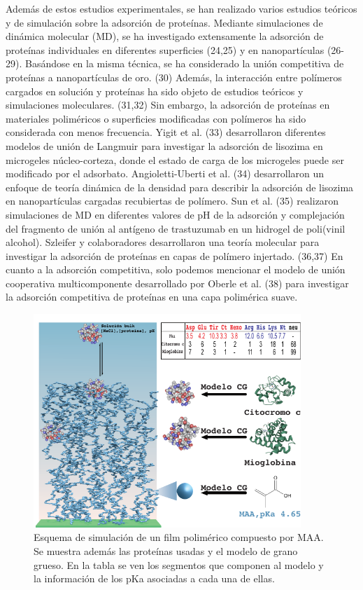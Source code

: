 Además de estos estudios experimentales, se han realizado varios estudios teóricos y de simulación sobre la adsorción de proteínas. Mediante simulaciones de dinámica molecular (MD), se ha investigado extensamente la adsorción de proteínas individuales en diferentes superficies (24,25) y en nanopartículas (26-29). Basándose en la misma técnica, se ha considerado la unión competitiva de proteínas a nanopartículas de oro. (30) Además, la interacción entre polímeros cargados en solución y proteínas ha sido objeto de estudios teóricos y simulaciones moleculares. (31,32) Sin embargo, la adsorción de proteínas en materiales poliméricos o superficies modificadas con polímeros ha sido considerada con menos frecuencia. Yigit et al. (33) desarrollaron diferentes modelos de unión de Langmuir para investigar la adsorción de lisozima en microgeles núcleo-corteza, donde el estado de carga de los microgeles puede ser modificado por el adsorbato. Angioletti-Uberti et al. (34) desarrollaron un enfoque de teoría dinámica de la densidad para describir la adsorción de lisozima en nanopartículas cargadas recubiertas de polímero. Sun et al. (35) realizaron simulaciones de MD en diferentes valores de pH de la adsorción y complejación del fragmento de unión al antígeno de trastuzumab en un hidrogel de poli(vinil alcohol). Szleifer y colaboradores desarrollaron una teoría molecular para investigar la adsorción de proteínas en capas de polímero injertado. (36,37) En cuanto a la adsorción competitiva, solo podemos mencionar el modelo de unión cooperativa multicomponente desarrollado por Oberle et al. (38) para investigar la adsorción competitiva de proteínas en una capa polimérica suave.



\begin{figure}[!htb]
	\centering
	\includegraphics[width=0.9\textwidth]{Figures/graph-film/film_model.pdf}
	\caption{Esquema de simulaci\'on de un film polim\'erico compuesto por MAA. Se muestra adem\'as las prote\'inas usadas y el modelo de grano grueso. En la tabla se ven los segmentos que componen al modelo y la informaci\'on de los pKa asociadas a cada una de ellas.}
	\label{fig:film:model_film}
\end{figure}




